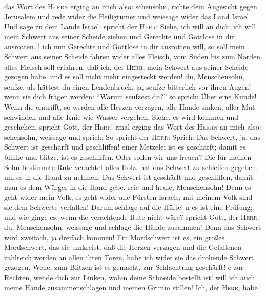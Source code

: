  das Wort des \textsc{Herrn} erging an mich also:
 schensohn, richte dein Angesicht gegen Jerusalem und rede
wider die Heiligtümer und weissage wider das Land Israel. Und sage zu
dem Lande Israel:  spricht der \textsc{Herr}: Siehe, ich
will an dich; ich will mein Schwert aus seiner Scheide ziehen und
Gerechte und Gottlose in dir ausrotten.  l ich nun
Gerechte und Gottlose in dir ausrotten will, so soll mein Schwert aus
seiner Scheide fahren wider alles Fleisch, vom Süden bis zum Norden.
 alles Fleisch soll erfahren, daß ich, der \textsc{Herr},
mein Schwert aus seiner Scheide gezogen habe, und es soll nicht mehr
eingesteckt werden!  du, Menschensohn, seufze, als hättest
du einen Lendenbruch, ja, seufze bitterlich vor ihren Augen!
 wenn sie dich fragen werden: ``Warum seufzest du?'' so
sprich: Über eine Kunde! Wenn die eintrifft, so werden alle Herzen
verzagen, alle Hände sinken, aller Mut schwinden und alle Knie wie
Wasser vergehen. Siehe, es wird kommen und geschehen, spricht Gott, der
\textsc{Herr}!  rmal erging das Wort des \textsc{Herrn} an
mich also:  schensohn, weissage und sprich: So spricht der
\textsc{Herr}: Sprich: Das Schwert, ja, das Schwert ist geschärft und
geschliffen!  einer Metzelei ist es geschärft; damit es
blinke und blitze, ist es geschliffen. Oder sollen wir uns freuen? Die
für meinen Sohn bestimmte Rute verachtet alles Holz.  hat
das Schwert zu schleifen gegeben, um es in die Hand zu nehmen. Das
Schwert ist geschärft und geschliffen, damit man es dem Würger in die
Hand gebe.  reie und heule, Menschensohn! Denn es geht
wider mein Volk, es geht wider alle Fürsten Israels; mit meinem Volk
sind sie dem Schwerte verfallen! Darum schlage auf die Hüfte!
 n es ist eine Prüfung; und wie ginge es, wenn die
verachtende Rute nicht wäre? spricht Gott, der \textsc{Herr}.
 du, Menschensohn, weissage und schlage die Hände
zusammen! Denn das Schwert wird zweifach, ja dreifach kommen! Ein
Mordschwert ist es, ein großes Mordschwert, das sie umkreist.
 daß die Herzen verzagen und die Gefallenen zahlreich
werden an allen ihren Toren, habe ich wider sie das drohende Schwert
gezogen. Wehe, zum Blitzen ist es gemacht, zur Schlachtung geschärft!
 e zur Rechten, wende dich zur Linken, wohin deine
Schneide bestellt ist!  will ich auch meine Hände
zusammenschlagen und meinen Grimm stillen! Ich, der \textsc{Herr}, habe
